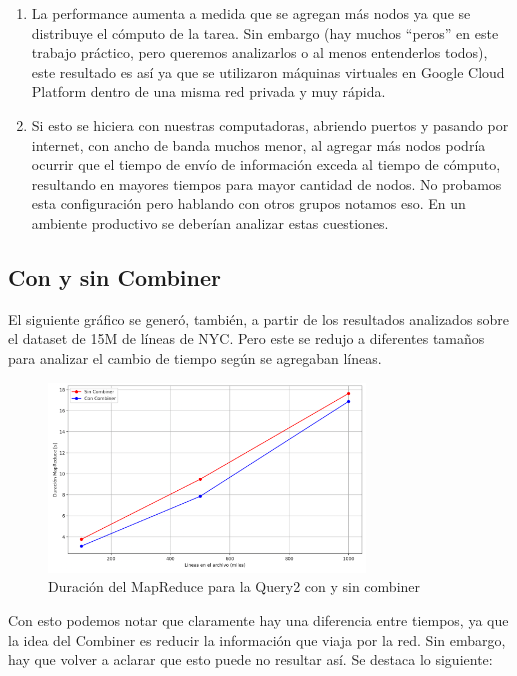 \documentclass[a4paper,12pt]{article}
\def\FIG#1#2{%
	{\centering#1\par}
	#2}
\begin{document}
	\begin{enumerate}
		\item La performance aumenta a medida que se agregan más nodos ya que se distribuye el cómputo de la tarea. Sin embargo (hay muchos ``peros'' en este trabajo práctico, pero queremos analizarlos o al menos entenderlos todos), este resultado es así ya que se utilizaron máquinas virtuales en Google Cloud Platform dentro de una misma red privada y muy rápida. 
		
		\item Si esto se hiciera con nuestras computadoras, abriendo puertos y pasando por internet, con ancho de banda muchos menor, al agregar más nodos podría ocurrir que el tiempo de envío de información exceda al tiempo de cómputo, resultando en mayores tiempos para mayor cantidad de nodos. No probamos esta configuración pero hablando con otros grupos notamos eso. En un ambiente productivo se deberían analizar estas cuestiones.
		
	\end{enumerate}
	
	\newpage
	
	\subsection{Con y sin Combiner}
	
	El siguiente gráfico se generó, también, a partir de los resultados analizados sobre el dataset de 15M de líneas de NYC. Pero este se redujo a diferentes tamaños para analizar el cambio de tiempo según se agregaban líneas.
	
	\begin{figure}[h!]%
		\FIG{\includegraphics[width=0.75\textwidth]{./con_vs_sin_combiner.png}}
		{\caption{Duración del MapReduce para la Query2 con y sin combiner}
			\label{fig2}}
	\end{figure}

	Con esto podemos notar que claramente hay una diferencia entre tiempos, ya que la idea del Combiner es reducir la información que viaja por la red. Sin embargo, hay que volver a aclarar que esto puede no resultar así. Se destaca lo siguiente:
	
\end{document}
